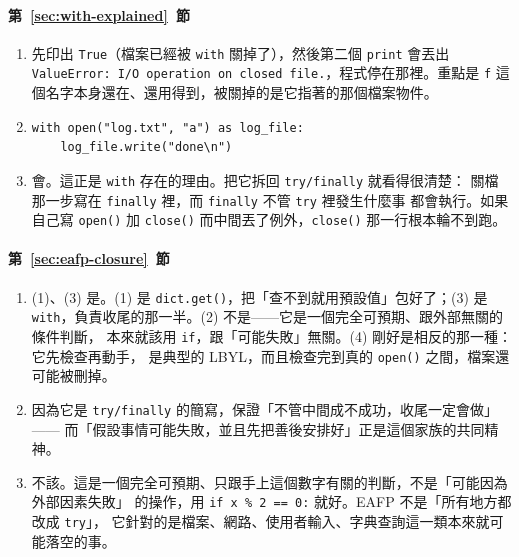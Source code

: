 \paragraph{第~\ref{sec:with-explained}~節}
\begin{enumerate}
\item 先印出 \texttt{True}（檔案已經被 \texttt{with} 關掉了），然後第二個 \texttt{print}
會丟出 \texttt{ValueError: I/O operation on closed file.}，程式停在那裡。重點是
\texttt{f} 這個名字本身還在、還用得到，被關掉的是它指著的那個檔案物件。
\item
\begin{verbatim}
with open("log.txt", "a") as log_file:
    log_file.write("done\n")
\end{verbatim}
\item 會。這正是 \texttt{with} 存在的理由。把它拆回 \texttt{try/finally} 就看得很清楚：
關檔那一步寫在 \texttt{finally} 裡，而 \texttt{finally} 不管 \texttt{try} 裡發生什麼事
都會執行。如果自己寫 \texttt{open()} 加 \texttt{close()} 而中間丟了例外，\texttt{close()}
那一行根本輪不到跑。
\end{enumerate}

\paragraph{第~\ref{sec:eafp-closure}~節}
\begin{enumerate}
\item (1)、(3) 是。(1) 是 \texttt{dict.get()}，把「查不到就用預設值」包好了；(3) 是
\texttt{with}，負責收尾的那一半。(2) 不是——它是一個完全可預期、跟外部無關的條件判斷，
本來就該用 \texttt{if}，跟「可能失敗」無關。(4) 剛好是相反的那一種：它先檢查再動手，
是典型的 LBYL，而且檢查完到真的 \texttt{open()} 之間，檔案還可能被刪掉。
\item 因為它是 \texttt{try/finally} 的簡寫，保證「不管中間成不成功，收尾一定會做」——
而「假設事情可能失敗，並且先把善後安排好」正是這個家族的共同精神。
\item 不該。這是一個完全可預期、只跟手上這個數字有關的判斷，不是「可能因為外部因素失敗」
的操作，用 \texttt{if x \% 2 == 0:} 就好。EAFP 不是「所有地方都改成 \texttt{try}」，
它針對的是檔案、網路、使用者輸入、字典查詢這一類本來就可能落空的事。
\end{enumerate}

